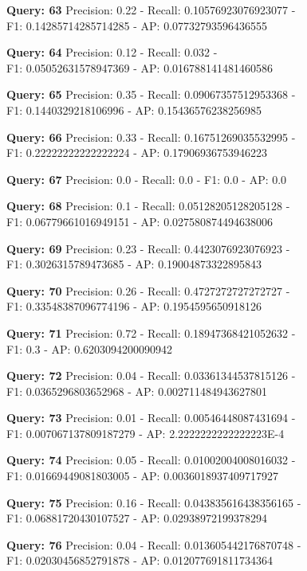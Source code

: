 \documentclass[a4paper, 11pt]{article}
\begin{document}
\textbf{Query: 63}
Precision: 0.22 - Recall: 0.10576923076923077 - \\
F1: 0.14285714285714285 - AP:  0.07732793596436555

\textbf{Query: 64}
Precision: 0.12 - Recall: 0.032 - \\
F1: 0.05052631578947369 - AP:  0.016788141481460586

\textbf{Query: 65}
Precision: 0.35 - Recall: 0.09067357512953368 - \\
F1: 0.1440329218106996 - AP:  0.15436576238256985

\textbf{Query: 66}
Precision: 0.33 - Recall: 0.16751269035532995 - \\
F1: 0.22222222222222224 - AP:  0.17906936753946223

\textbf{Query: 67}
Precision: 0.0 - Recall: 0.0 - F1: 0.0 - AP:  0.0

\textbf{Query: 68}
Precision: 0.1 - Recall: 0.05128205128205128 - \\
F1: 0.06779661016949151 - AP:  0.027580874494638006

\textbf{Query: 69}
Precision: 0.23 - Recall: 0.4423076923076923 - \\
F1: 0.3026315789473685 - AP:  0.19004873322895843

\textbf{Query: 70}
Precision: 0.26 - Recall: 0.4727272727272727 - \\
F1: 0.33548387096774196 - AP:  0.1954595650918126

\textbf{Query: 71}
Precision: 0.72 - Recall: 0.18947368421052632 - \\
F1: 0.3 - AP:  0.6203094200090942

\textbf{Query: 72}
Precision: 0.04 - Recall: 0.03361344537815126 - \\
F1: 0.0365296803652968 - AP:  0.002711484943627801

\textbf{Query: 73}
Precision: 0.01 - Recall: 0.00546448087431694 - \\
F1: 0.007067137809187279 - AP:  2.2222222222222223E-4

\textbf{Query: 74}
Precision: 0.05 - Recall: 0.01002004008016032 - \\
F1: 0.01669449081803005 - AP:  0.0036018937409717927

\textbf{Query: 75}
Precision: 0.16 - Recall: 0.043835616438356165 - \\
F1: 0.06881720430107527 - AP:  0.02938972199378294

\textbf{Query: 76}
Precision: 0.04 - Recall: 0.013605442176870748 - \\
F1: 0.02030456852791878 - AP:  0.012077691811734364
\end{document}

